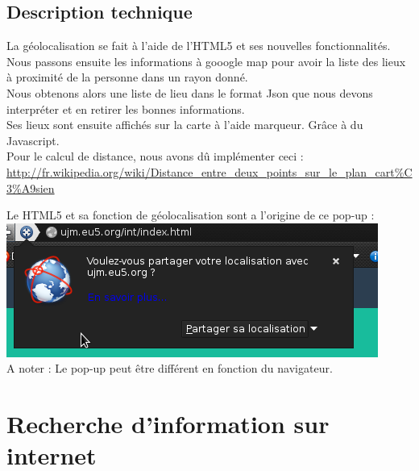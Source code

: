 \documentclass[10pt,a4paper]{report}
\begin{document}
\subsection{Description technique}
\begin{flushleft}
La géolocalisation se fait à l'aide de l'HTML5 et ses nouvelles fonctionnalités. Nous passons ensuite les informations à gooogle map pour avoir la liste des lieux à proximité de la personne dans un rayon donné. \\
Nous obtenons alors une liste de lieu dans le format Json que nous devons interpréter et en retirer les bonnes informations.\\
Ses lieux sont ensuite affichés sur la carte à l'aide marqueur. Grâce à du Javascript. \\

Pour le calcul de distance, nous avons dû implémenter ceci : 
\url{http://fr.wikipedia.org/wiki/Distance_entre_deux_points_sur_le_plan_cart%C3%A9sien}

Le HTML5 et sa fonction de géolocalisation sont a l'origine de ce pop-up : 
\includegraphics[scale=0.5]{./images/demande.png} \\

A noter : Le pop-up peut être différent en fonction du navigateur.
\end{flushleft}



\section{Recherche d'information sur internet}
\end{document}
